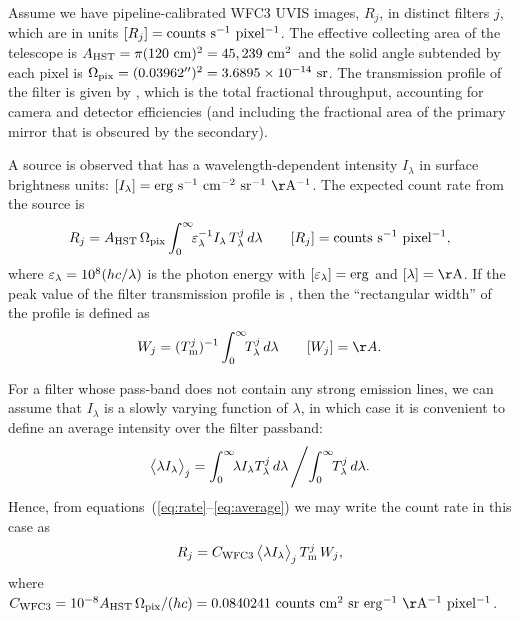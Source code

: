\documentclass[preprint, 12pt]{aastex}
\begin{document}
Assume we have pipeline-calibrated WFC3 UVIS images, \(R_j\), 
in distinct filters \(j\), 
which are in units \([R_j] = \U{counts\ s^{-1}\ pixel^{-1}}\).  The
effective collecting area of the telescope is \(A_{\mathrm{HST}} =
\pi (120\ \mathrm{cm})^2 = 45,239\ \mathrm{cm^2}\) and the solid angle
subtended by each pixel is \(\Omega_{\mathrm{pix}} = (0.03962'')^2 = 3.6895\times 10^{-14}\
\mathrm{sr}\).  
The transmission profile of the filter is given by
, which is the total fractional throughput, 
accounting for camera and detector efficiencies (and including the
fractional area of the primary mirror that is obscured by the secondary).  

A source is observed that has a wavelength-dependent intensity 
\(I_\lambda\) in surface brightness units: 
\([I_\lambda] = \U{erg\ s^{-1}\ cm^{-2}\ sr^{-1}\ \AA^{-1}}\). 
The expected count rate from the source is
\begin{equation}
  \label{eq:rate}
  R_j = \Area\, \Pixel \int_0^\infty \!\!\Elam^{-1} I_\lambda\,
  \Tlam{j} \, d\lambda \quad\quad [R_j] = \U{counts\ s^{-1}\ pixel^{-1}}, 
\end{equation}
where \(\varepsilon_\lambda = 10^{8} (h c / \lambda)\) is the photon energy with
\([\varepsilon_\lambda] = \mathrm{erg}\) and \([\lambda] = \U{\AA}\). 
If the peak value of the filter transmission profile is , then the
``rectangular width'' of the profile is defined as
\begin{equation}
  \label{eq:width}
  W_j = (\Tmax{j})^{-1} \int_0^\infty \!\!\Tlam{j}\, d\lambda 
  \quad\quad [W_j] = \AA.
\end{equation}

For a filter whose pass-band does not contain any strong emission
lines, we can assume that \(I_\lambda\) is a slowly varying function of
\(\lambda\), in which case it is convenient to define an average
intensity over the filter passband:
\begin{equation}
  \label{eq:average}
  \bigl\langle \lambda I_\lambda \bigr\rangle_{j} = \int_0^\infty \!\!\lambda I_\lambda T_{\lambda}^{j} \, d\lambda \,
  \Bigg/\! \int_0^\infty \!\!T_{\lambda}^{j} \, d\lambda .
\end{equation}
Hence, from equations~(\ref{eq:rate}--\ref{eq:average}) we may write
the count rate in this case as
\begin{equation}
  \label{eq:continuum}
  R_j = C_{\mathrm{WFC3}}\, \bigl\langle \lambda I_\lambda \bigr\rangle_{j}\, T_{\mathrm{m}}^{j}\, W_j , 
\end{equation}
where \(\Constant = 10^{-8} \Area\, \Pixel / (h c) = 0.0840241\ \U{counts\
  cm^2\
  sr\ erg^{-1}\ \AA^{-1}\ pixel^{-1}}\). 
\end{document}
